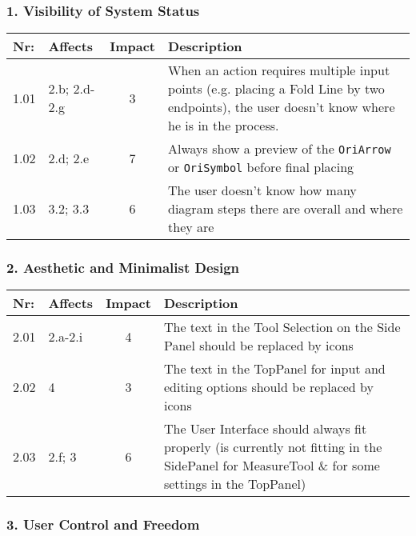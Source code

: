 \subsubsection*{1. Visibility of System Status}
\label{sec:visibility}

        \begin{tabular}{l | p{} | c | p{}}
        Nr: & Affects & Impact & Description \\ \hline
        1.01 & 2.b; 2.d-2.g & 3 & When an action requires multiple input points (e.g. placing a Fold Line by two endpoints), the user doesn't know where he is in the process. \\ \hline %
        1.02 & 2.d; 2.e & 7 & Always show a preview of the \texttt{OriArrow} or \texttt{OriSymbol} before final placing\\ \hline
        1.03 & 3.2; 3.3 & 6 & The user doesn't know how many diagram steps there are overall and where they are\\ \hline
        \end{tabular}



\subsubsection*{2. Aesthetic and Minimalist Design}
        \begin{tabular}{l | p{} | c | p{}}
        Nr: & Affects & Impact & Description \\ \hline
        2.01 & 2.a-2.i  & 4 &  The text in the Tool Selection on the Side Panel should be replaced by icons\\ \hline 
	2.02 & 4 & 3 & The text in the TopPanel for input and editing options should be replaced by icons\\ \hline
	2.03 & 2.f; 3 & 6 & The User Interface should always fit properly (is currently not fitting in the SidePanel for MeasureTool \& for some settings in the TopPanel)\\ \hline
        \end{tabular}

\subsubsection*{3. User Control and Freedom}

